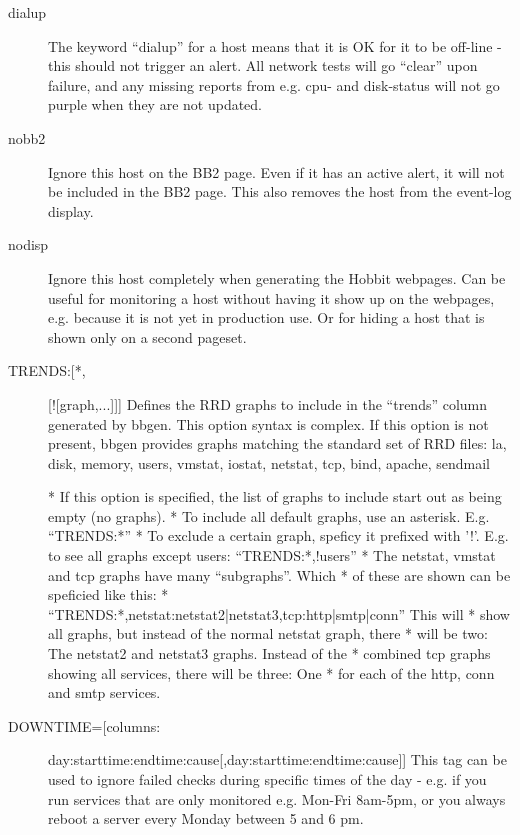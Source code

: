 \begin{description}
 

\item[dialup] The keyword ``dialup'' for a host means that it is OK
  for it to be off-line - this should not trigger an alert. All
  network tests will go ``clear'' upon failure, and any missing
  reports from e.g. cpu- and disk-status will not go purple when they
  are not updated. 


 

\item[nobb2] Ignore this host on the BB2 page. Even if it has an
  active alert, it will not be included in the BB2 page. This also
  removes the host from the event-log display. 


 

\item[nodisp] Ignore this host completely when generating the Hobbit
  webpages. Can be useful for monitoring a host without having it show
  up on the webpages, e.g. because it is not yet in production use. Or
  for hiding a host that is shown only on a second pageset. 


 

\item[TRENDS:[*,][![graph,...]]] Defines the RRD graphs to include in the ``trends'' column generated by bbgen. This option syntax is complex.  
 If this option is not present, bbgen provides graphs matching the
 standard set of RRD files: la, disk, memory, users, vmstat, iostat,
 netstat, tcp, bind, apache, sendmail  

 * If this option is specified, the list of graphs to include start out as being empty (no graphs).  
 * To include all default graphs, use an asterisk. E.g. ``TRENDS:*''  
 * To exclude a certain graph, speficy it prefixed with '!'. E.g. to see all graphs except users: ``TRENDS:*,!users''  
 * The netstat, vmstat and tcp graphs have many ``subgraphs''. Which
 * of these are shown can be speficied like this:
 * ``TRENDS:*,netstat:netstat2|netstat3,tcp:http|smtp|conn'' This will
 * show all graphs, but instead of the normal netstat graph, there
 * will be two: The netstat2 and netstat3 graphs. Instead of the
 * combined tcp graphs showing all services, there will be three: One
 * for each of the http, conn and smtp services. 


 

\item[DOWNTIME=[columns:]day:starttime:endtime:cause[,day:starttime:endtime:cause]]
  This tag can be used to ignore failed checks during specific times
  of the day - e.g. if you run services that are only monitored
  e.g. Mon-Fri 8am-5pm, or you always reboot a server every Monday
  between 5 and 6 pm. 



\end{description}
